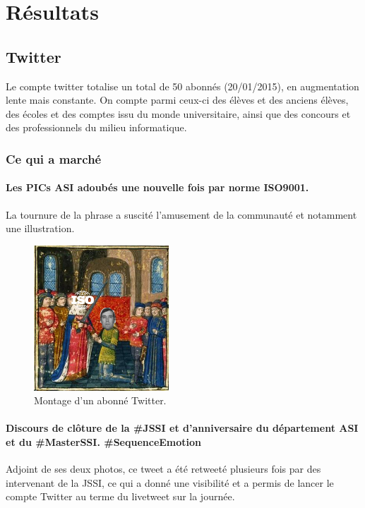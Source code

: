 \section{Résultats}

\subsection{Twitter}

Le compte twitter totalise un total de 50 abonnés (20/01/2015), en augmentation lente mais constante. On compte parmi ceux-ci des élèves et des anciens élèves, des écoles et des comptes issu du monde universitaire, ainsi que des concours et des professionnels du milieu informatique.


\subsubsection{Ce qui a marché}
\paragraph{Les PICs ASI adoubés une nouvelle fois par norme ISO9001.}
La tournure de la phrase a suscité l'amusement de la communauté et notamment une illustration.

\begin{figure}
	\begin{center}
		\includegraphics[width=0.45\textwidth]{images/adoubement.png}
		\caption{Montage d'un abonné Twitter.}
	\end{center}
\end{figure}

\paragraph{Discours de clôture de la \#JSSI et d'anniversaire du département ASI et du \#MasterSSI. \#SequenceEmotion }
Adjoint de ses deux photos, ce tweet a été retweeté plusieurs fois par des intervenant de la JSSI, ce qui a donné une visibilité et a permis de lancer le compte Twitter au terme du livetweet sur la journée.

